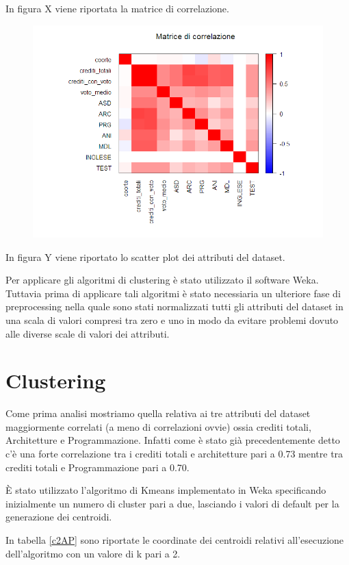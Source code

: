 \documentclass[12pt]{article}
\begin{document}
In figura X viene riportata la matrice di correlazione.
\begin{figure}[H]
	\includegraphics[width=\textwidth]{img/corMatrix.png}
\end{figure}

In figura Y viene riportato lo scatter plot dei attributi del dataset.

Per applicare gli algoritmi di clustering è stato utilizzato il software Weka. Tuttavia prima di applicare tali algoritmi è stato necessiaria un ulteriore fase di preprocessing
nella quale sono stati normalizzati tutti gli attributi del dataset in una scala di valori compresi tra zero e uno in modo da evitare problemi dovuto alle diverse scale di valori dei attributi.


\section{Clustering}
Come prima analisi mostriamo quella relativa ai tre attributi del dataset maggiormente correlati (a meno di correlazioni ovvie) ossia crediti totali, Architetture e Programmazione.
Infatti come è stato già precedentemente detto c'è una forte correlazione tra i crediti totali e architetture pari a 0.73 mentre tra crediti totali e Programmazione pari a 0.70.

È stato utilizzato l'algoritmo di Kmeans implementato in Weka specificando inizialmente un numero di cluster pari a due, lasciando i valori di default per la generazione dei centroidi.

In tabella \ref{c2AP} sono riportate le coordinate dei centroidi relativi all'esecuzione dell'algoritmo con un valore di k pari a 2.
\end{document}
